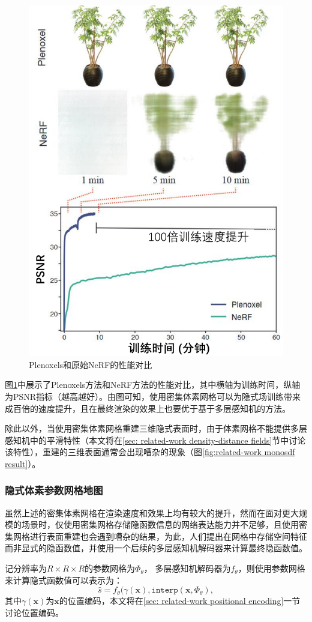 \begin{figure}[ht]
    \centering
    \includegraphics[width=.5\textwidth]{undergraduate-thesis/images/related-work/plenoxels-result.pdf}
    \caption{Plenoxels\cite{fridovich-keil_plenoxels_2022}和原始NeRF\cite{mildenhall_nerf_2020}的性能对比}
    \label{fig:related-work plenoxels-result}
\end{figure}

图\ref{fig:related-work plenoxels-result}中展示了Plenoxels方法和NeRF方法的性能对比，其中横轴为训练时间，纵轴为PSNR指标（越高越好）。由图可知，使用密集体素网格可以为隐式场训练带来成百倍的速度提升，且在最终渲染的效果上也要优于基于多层感知机的方法。

除此以外，当使用密集体素网格重建三维隐式表面时，由于体素网格不能提供多层感知机中的平滑特性（本文将在\ref{sec: related-work density-distance fields}节中讨论该特性），重建的三维表面通常会出现嘈杂的现象（图\ref{fig:related-work monosdf result}）。

\subsubsection{隐式体素参数网格地图}
虽然上述的密集体素网格在渲染速度和效果上均有较大的提升，然而在面对更大规模的场景时，仅使用密集网格存储隐函数信息的网络表达能力并不足够，且使用密集网格进行表面重建也会遇到嘈杂的结果，为此，人们提出在网格中存储空间特征而非显式的隐函数值\cite{liu_neural_2021, takikawa_neural_2021, yu_monosdf_2022, huang_di-fusion_2021, peng_convolutional_2020}，并使用一个后续的多层感知机解码器来计算最终隐函数值。

记分辨率为$R\times R\times R$的参数网格为$\Phi_\theta$， 多层感知机解码器为$f_\theta$，则使用参数网格来计算隐式函数值可以表示为：
\begin{equation}
    \hat{s} = f_\theta(\gamma(\mathbf{x}), \mathtt{interp}(\mathbf{x}, \Phi_\theta),
\end{equation}
其中$\gamma(\mathbf{x})$为$\mathbf{x}$的位置编码，本文将在\ref{sec: related-work positional encoding}一节讨论位置编码。

